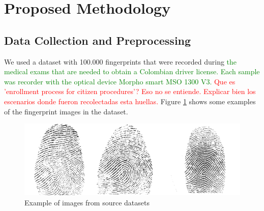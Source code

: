 \documentclass[a4paper,fleqn]{cas-dc}
\begin{document}
     
     
\section{Proposed Methodology}
\label{sec:PM}

\subsection{Data Collection and Preprocessing}
\label{sec:DP}
We used a dataset with 100.000 fingerprints that were recorded during \textcolor{green}{the medical exams that are needed to obtain a Colombian driver license. Each sample was recorder with the optical device Morpho smart MSO 1300 V3.} \textcolor{red}{Que es 'enrollment process for citizen procedures'? Eso no se entiende. Explicar bien los escenarios donde fueron recolectadas esta huellas.} Figure \ref{fig1} shows some examples of the fingerprint images in the dataset.
\begin{figure}[ht]
\centerline{\includegraphics[scale=0.3]{figs/dataset_example.png}}
\caption{Example of images from source datasets}
\label{fig1}
\end{figure}
\end{document}
